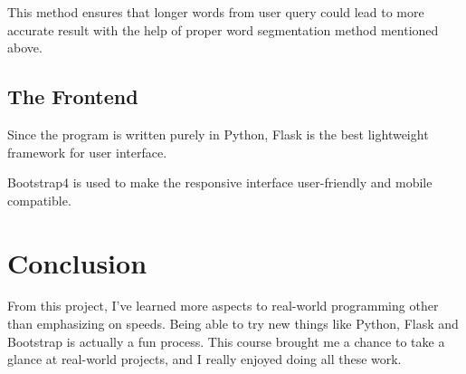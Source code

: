 \documentclass[a4paper]{article}
\begin{document}
This method ensures that longer words from user query could lead to more accurate result with the help of proper word segmentation method mentioned above.

\subsection{The Frontend}

Since the program is written purely in Python, Flask is the best lightweight framework for user interface. 

Bootstrap4 is used to make the responsive interface user-friendly and mobile compatible.

\section{Conclusion}

From this project, I've learned more aspects to real-world programming other than emphasizing on speeds. Being able to try new things like Python, Flask and Bootstrap is actually a fun process. This course brought me a chance to take a glance at real-world projects, and I really enjoyed doing all these work.
\end{document}
